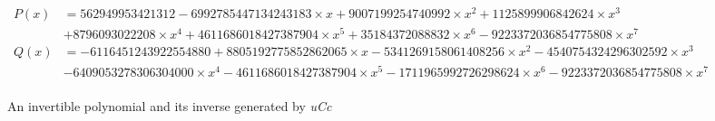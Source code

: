 \documentclass[compsoc,conference,a4paper,10pt,times]{IEEEtran}
\begin{document}




\begin{figure*}[ht]
  \begin{align*}
    P(x) &= 562949953421312 - 6992785447134243183 \times x +  9007199254740992 \times x^2 + 1125899906842624 \times x^3 \\
         &+ 8796093022208 \times x^4 + 4611686018427387904 \times x^5 + 35184372088832 \times x^6 - 9223372036854775808 \times x^7 \\
    Q(x) &= -6116451243922554880 + 8805192775852862065 \times x - 5341269158061408256 \times x^2 - 4540754324296302592 \times x^3 \\
         &- 6409053278306304000 \times x^4 - 4611686018427387904 \times x^5 - 1711965992726298624 \times x^6 - 9223372036854775808 \times x^7 \\
  \end{align*}
  \caption{An invertible polynomial and its inverse generated by \emph{uCc}}
  \label{fig:invertiblepolynomial}
\end{figure*}
\end{document}
